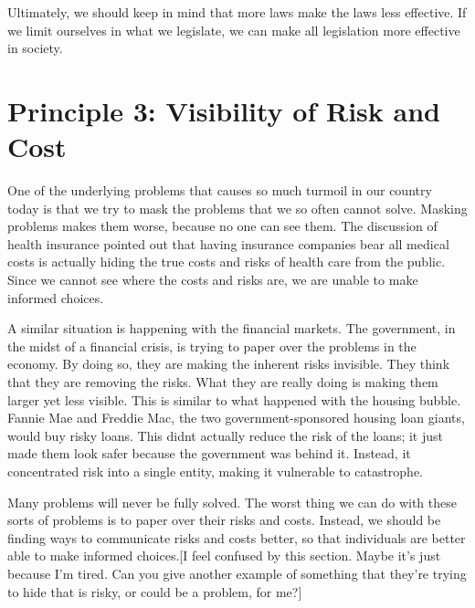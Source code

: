 \documentclass[letterpaper]{article}
\begin{document}
{\color{black}
\textcolor[rgb]{0.32941177,0.5529412,0.83137256}{Ultimately}, we should
keep in mind that more laws make the laws less effective.  If we limit
ourselves in what we legislate, we can make all legislation more
effective in society.\textcolor[rgb]{0.32941177,0.5529412,0.83137256}{ 
}}

\section{Principle 3: Visibility of Risk and Cost}
{\color{black}
One of the underlying problems that causes so much turmoil in our
country today is that
\textcolor[rgb]{0.32941177,0.5529412,0.83137256}{we try to mask the
problems that we so often cannot solve. } Masking problems makes them
worse, because no one can see them. The discussion of health insurance
pointed out that having insurance companies bear all medical costs is
actually hiding the true costs and risks of health care from the
public. Since we cannot see where the costs and risks are, we are
unable to make informed choices.}

{\color{black}
A similar situation is happening with the financial markets. The
government, in the midst of
\textcolor[rgb]{0.32941177,0.5529412,0.83137256}{a} financial crisis,
is trying to paper over the problems in the economy. By doing so, they
are making the inherent risks invisible. They think that they are
removing the risks. What they are really doing is making them larger
yet less visible. This is similar to what happened with the housing
bubble. Fannie Mae and Freddie Mac, the two government-sponsored
housing loan giants, would buy risky loans. This
didn{\textquotesingle}t actually reduce the risk of the loans; it just
made them look safer because the government was behind it. Instead, it
concentrated risk into a single entity, making it vulnerable to
catastrophe.}

{\color{black}
Many problems will never be fully solved. The worst thing we can do with
these sorts of problems is to paper over their risks and costs.
Instead, we should be finding ways to communicate risks and costs
better, so that individuals are better able to make informed
choices.\textcolor[rgb]{0.32941177,0.5529412,0.83137256}{[I feel
confused by this section. Maybe it’s just because I’m tired. Can you
give another example of something that they’re trying to hide that is
risky, or could be a problem, for me?]}}
\end{document}
